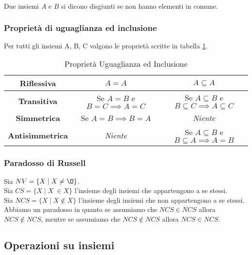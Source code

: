 \begin{definition}
	Due insiemi $A$ e $B$ si dicono disgiunti se non hanno elementi in comune.
\end{definition}

\subsubsection{Proprietà di uguaglianza ed inclusione}
Per tutti gli insiemi A, B, C valgono le proprietà scritte in tabella \ref{tab:proprietà-uguaglianza-inclusione}.
\begin{table}[h!]
    \centering
    \setlength{\tabcolsep}{7pt}
    \renewcommand{\arraystretch}{2.5}
    \begin{tabular}{|c|c|c|}
        \hline
        \textbf{Riflessiva} & $A = A$ & $A \subseteq A$ \\
        \hline
        \textbf{Transitiva} & Se $A = B$ e $B = C \implies A = C$ & Se $A \subseteq B$ e $B \subseteq C \implies A \subseteq C$\\
        \hline
        \textbf{Simmetrica} & Se $A = B \implies B = A$ & \textit{Niente}\\
        \hline
        \textbf{Antisimmetrica} & \textit{Niente} & Se $A \subseteq B$ e $B \subseteq A \implies A = B$\\
        \hline
    \end{tabular}
    \caption{Proprietà Uguaglianza ed Inclusione}
    \label{tab:proprietà-uguaglianza-inclusione}
\end{table}

\subsubsection{Paradosso di Russell}
Sia $NV = \{X \mid X \neq \O\}$.\\
Sia $CS = \{X \mid X\ \in X\}$ l'insieme degli insiemi che appartengono a se stessi.\\
Sia $NCS = \{X \mid X \notin X\}$ l'insieme degli insiemi che non appartengono a se stessi.\\
Abbiamo un paradosso in quanto se assumiamo che $NCS \in NCS$ allora $NCS \notin NCS$, mentre se assumiamo che $NCS \notin NCS$ allora $NCS \in NCS$.

\subsection{Operazioni su insiemi}
